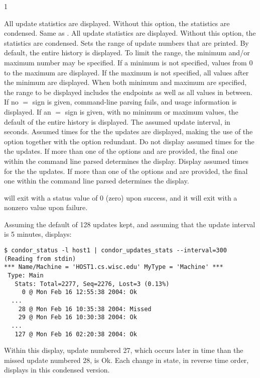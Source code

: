 \begin{ManPage}{\label{man-condor-updates-stats}}{1}
\begin{Options}
	{All update statistics are displayed.
	Without this option, the statistics are condensed.}
	{Same as .
	All update statistics are displayed.
	Without this option, the statistics are condensed.}
	 {Sets the
	range of update numbers that
	are printed.  By default, the entire history is displayed.
	To limit the range, the minimum and/or maximum
	number may be specified.
	If a minimum is not specified, values from 0 to the maximum
	are displayed.
	If the maximum is not specified, all values after the minimum
	are displayed.
	When both minimum and maximum are specified, the range
	to be displayed includes the endpoints as well as all
	values in between.
	If no $=$ sign is given, command-line parsing fails,
	and usage information is displayed.
	If an  $=$ sign is given, with no minimum or maximum values,
	the default of the entire history is displayed.}
	 {The assumed update
	interval, in seconds.
	Assumed times for the the updates are displayed, making the
	use of the  option together with 
	the  option redundant.}
	 {Do not display assumed times for the
	the updates.
	If more than one of the options  and 
	are provided, the final one within the command line parsed
	determines the display.  }
	 {Display assumed times for the the updates.
	If more than one of the options  and 
	are provided, the final one within the command line parsed
	determines the display.  }
\end{Options}

\ExitStatus

 will exit with a status value of 0 (zero) upon success,
and it will exit with a nonzero value upon failure.

\Examples
Assuming the default of 128 updates kept, 
and assuming that the update interval is 5 minutes,
 displays: 
\footnotesize
\begin{verbatim}
$ condor_status -l host1 | condor_updates_stats --interval=300
(Reading from stdin)
*** Name/Machine = 'HOST1.cs.wisc.edu' MyType = 'Machine' ***
 Type: Main
   Stats: Total=2277, Seq=2276, Lost=3 (0.13%)
     0 @ Mon Feb 16 12:55:38 2004: Ok
  ...
    28 @ Mon Feb 16 10:35:38 2004: Missed
    29 @ Mon Feb 16 10:30:38 2004: Ok
  ...
   127 @ Mon Feb 16 02:20:38 2004: Ok
\end{verbatim}
\normalsize

Within this display, update numbered 27, which occurs later in time
than the missed update numbered 28, is Ok.
Each change in state, in reverse time order, displays in this
condensed version.
\normalsize


\end{ManPage}
